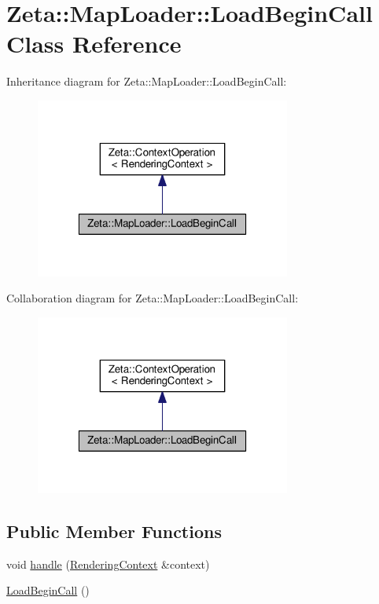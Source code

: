\hypertarget{classZeta_1_1MapLoader_1_1LoadBeginCall}{\section{Zeta\+:\+:Map\+Loader\+:\+:Load\+Begin\+Call Class Reference}
\label{classZeta_1_1MapLoader_1_1LoadBeginCall}
}


Inheritance diagram for Zeta\+:\+:Map\+Loader\+:\+:Load\+Begin\+Call\+:\nopagebreak
\begin{figure}[H]
\begin{center}
\leavevmode
\includegraphics[width=238pt]{classZeta_1_1MapLoader_1_1LoadBeginCall__inherit__graph}
\end{center}
\end{figure}


Collaboration diagram for Zeta\+:\+:Map\+Loader\+:\+:Load\+Begin\+Call\+:\nopagebreak
\begin{figure}[H]
\begin{center}
\leavevmode
\includegraphics[width=238pt]{classZeta_1_1MapLoader_1_1LoadBeginCall__coll__graph}
\end{center}
\end{figure}
\subsection*{Public Member Functions}
\begin{DoxyCompactItemize}
\item 
void \hyperlink{classZeta_1_1MapLoader_1_1LoadBeginCall_a32cf42f4232fae17fd3123b6511b056f}{handle} (\hyperlink{classZeta_1_1RenderingContext}{Rendering\+Context} \&context)
\item 
\hyperlink{classZeta_1_1MapLoader_1_1LoadBeginCall_a39a91113605014ed0d956d514f0074b3}{Load\+Begin\+Call} ()
\end{DoxyCompactItemize}
